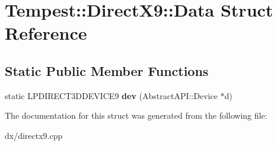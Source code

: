 \hypertarget{struct_direct_x9_1_1_data}{\section{Tempest\+:\+:Direct\+X9\+:\+:Data Struct Reference}
\label{struct_direct_x9_1_1_data}
}
\subsection*{Static Public Member Functions}
\begin{DoxyCompactItemize}
\item 
\hypertarget{struct_direct_x9_1_1_data_aaf6a241138f76c3cdd3a8ab1541086fb}{static L\+P\+D\+I\+R\+E\+C\+T3\+D\+D\+E\+V\+I\+C\+E9 {\bfseries dev} (Abstract\+A\+P\+I\+::\+Device $\ast$d)}\label{struct_direct_x9_1_1_data_aaf6a241138f76c3cdd3a8ab1541086fb}

\end{DoxyCompactItemize}


The documentation for this struct was generated from the following file\+:\begin{DoxyCompactItemize}
\item 
dx/directx9.\+cpp\end{DoxyCompactItemize}
